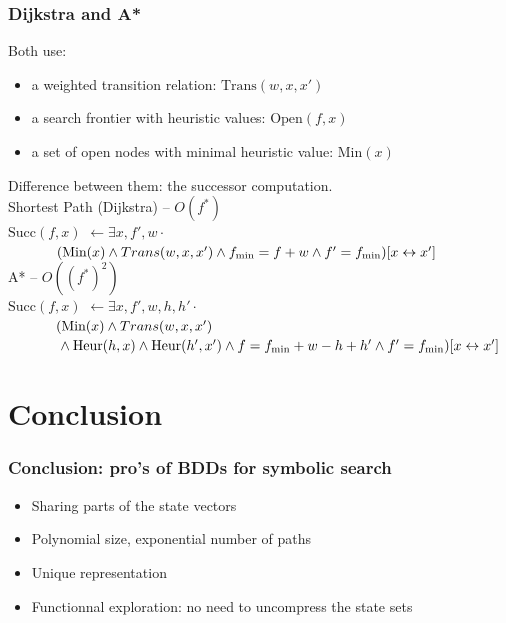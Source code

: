 \documentclass[10pt,a4paper,pdf]{beamer}
\renewcommand{\t}[1]{\text{#1}}
\begin{document}
\begin{frame}
\frametitle{Dijkstra and A*}

Both use:
\begin{itemize}
\item a weighted transition relation: $\t{Trans}(w,x,x')$
\item a search frontier with heuristic values: $\t{Open}(f,x)$
\item a set of open nodes with minimal heuristic value: $\t{Min}(x)$ 
\end{itemize}

Difference between them: the successor computation.\\[1cm]

Shortest Path (Dijkstra) -- $O(f^*)$\\[0.2cm]
$\t{Succ}(f,x)$ $\leftarrow 
			       \exists x,f',w \cdot$ 
				       $\phantom{} \hspace{1.2cm} ( \t{Min}(x) \land Trans(w,x,x') \land
				       f_\t{min}=f+w \land
				       f' = f_\t{min})[x \leftrightarrow x']$				       
				       \\[1cm]
A* -- $O((f^*)^2)$\\[0.2cm]
$\t{Succ}(f,x)$ $\leftarrow 
				       \exists x,f',w,h,h' \cdot$\\
				       $\phantom{} \hspace{1.2cm} ( \t{Min}(x) \land Trans(w,x,x')$
				       $\phantom{} \hspace{1.2cm}
				       \land \t{Heur}(h,x) \land \t{Heur}(h',x') \land f=f_\t{min}+w-h+h'
				       \land f' = f_\t{min})[x \leftrightarrow x']$

\end{frame}

%

\section{Conclusion}
\begin{frame}
\frametitle{Conclusion: pro's of BDDs for symbolic search}
\begin{itemize}
\item Sharing parts of the state vectors
\item Polynomial size, exponential number of paths
\item Unique representation
\item Functionnal exploration: no need to uncompress the state sets
\end{itemize}
\end{frame}
\end{document}
